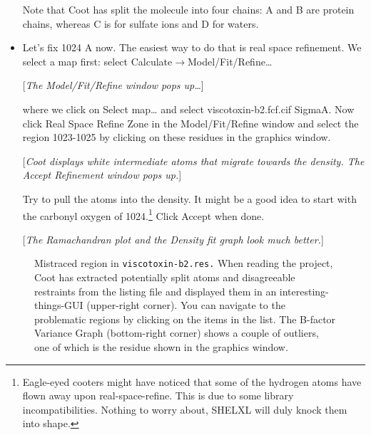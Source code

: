 \documentclass{article}
\begin{document}
\begin{itemize}
  Note that Coot has split the molecule into four chains: A and B are
  protein chains, whereas C is for sulfate ions and D for waters.


\item Let's fix 1024 A now. The easiest way to do that is real space
  refinement. We select a map first: select
  \textsf{Calculate$\to$Model/Fit/Refine\ldots}

  [\textsl{The \textsf{Model/Fit/Refine} window pops up\ldots}]

  where we click on \textsf{Select map\ldots} and select
  viscotoxin-b2.fcf.cif SigmaA. Now click \textsf{Real Space Refine
    Zone} in the \textsf{Model/Fit/Refine} window and select the
  region 1023-1025 by clicking on these residues in the graphics
  window.

  [\textsl{Coot displays white intermediate atoms that migrate towards
    the density. The \textsf{Accept Refinement} window pops up.}]

  Try to pull the atoms into the density. It might be a good idea to
  start with the carbonyl oxygen of 1024.\footnote{Eagle-eyed cooters
    might have noticed that some of the hydrogen atoms have flown away
    upon real-space-refine. This is due to some library
    incompatibilities. Nothing to worry about, SHELXL will duly knock
    them into shape.} Click \textsf{Accept} when done.

  [\textsl{The Ramachandran plot and the Density fit graph look much
    better.}]
\end{itemize}

\begin{figure}[htbp]
    \begin{center}
    \epsfxsize 5in
    \parbox{5in}{\caption{\label{fig:viscotoxin} Mistraced region in
        \texttt{viscotoxin-b2.res.} When reading the project, Coot has
        extracted potentially split atoms and disagreeable restraints
        from the listing file and displayed them in an
        interesting-things-GUI (upper-right corner). You can navigate
        to the problematic regions by clicking on the items in the
        list. The B-factor Variance Graph (bottom-right corner) shows
        a couple of outliers, one of which is the residue shown in the
        graphics window.}}
    \end{center}
\end{figure}
\end{document}
